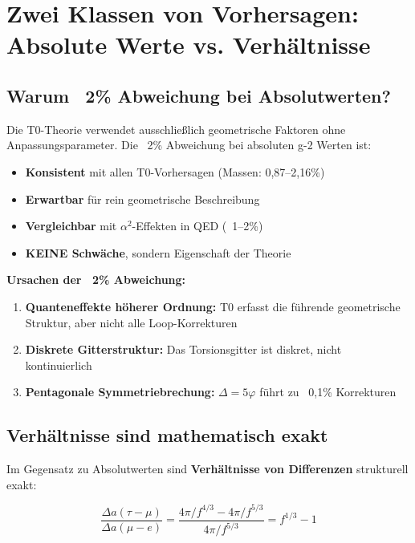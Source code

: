 	\section{Zwei Klassen von Vorhersagen: Absolute Werte vs. Verhältnisse}
	
	\subsection{Warum ~2\% Abweichung bei Absolutwerten?}
	
	Die T0-Theorie verwendet ausschließlich geometrische Faktoren ohne Anpassungsparameter. Die ~2\% Abweichung bei absoluten g-2 Werten ist:
	
	\begin{itemize}
		\item \textbf{Konsistent} mit allen T0-Vorhersagen (Massen: 0{,}87--2{,}16\%)
		\item \textbf{Erwartbar} für rein geometrische Beschreibung
		\item \textbf{Vergleichbar} mit $\alpha^2$-Effekten in QED (~1--2\%)
		\item \textbf{KEINE Schwäche}, sondern Eigenschaft der Theorie
	\end{itemize}
	
	\textbf{Ursachen der ~2\% Abweichung:}
	\begin{enumerate}
		\item \textbf{Quanteneffekte höherer Ordnung:} T0 erfasst die führende geometrische Struktur, aber nicht alle Loop-Korrekturen
		\item \textbf{Diskrete Gitterstruktur:} Das Torsionsgitter ist diskret, nicht kontinuierlich
		\item \textbf{Pentagonale Symmetriebrechung:} $\Delta = 5\varphi$ führt zu ~0{,}1\% Korrekturen
	\end{enumerate}
	
	\subsection{Verhältnisse sind mathematisch exakt}
	
	Im Gegensatz zu Absolutwerten sind \textbf{Verhältnisse von Differenzen} strukturell exakt:
	
	\begin{equation}
		\frac{\Delta a(\tau - \mu)}{\Delta a(\mu - e)} = \frac{4\pi/f^{4/3} - 4\pi/f^{5/3}}{4\pi/f^{5/3}} = f^{1/3} - 1
	\end{equation}
	

